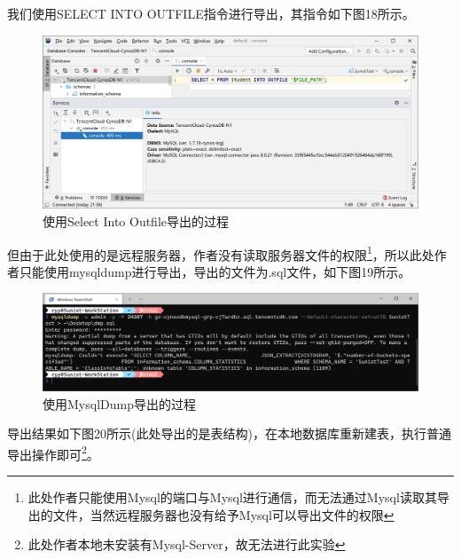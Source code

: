 \documentclass[a4paper,UTF8,heading=false,12pt]{article}
\begin{document}
我们使用SELECT INTO OUTFILE指令进行导出，其指令如下图18所示。

\begin{figure}[htbp]
    \centering
    \includegraphics[width=15cm]{../Images/ExportWithCommand.png}
    \caption{使用Select Into Outfile导出的过程}
\end{figure}

但由于此处使用的是远程服务器，作者没有读取服务器文件的权限\footnote{此处作者只能使用Mysql的端口与Mysql进行通信，而无法通过Mysql读取其导出的文件，当然远程服务器也没有给予Mysql可以导出文件的权限}，所以此处作者只能使用mysqldump进行导出，导出的文件为.sql文件，如下图19所示。

\begin{figure}[htbp]
    \centering
    \includegraphics[width=15cm]{../Images/ExportWithCommand_OnExported.png}
    \caption{使用MysqlDump导出的过程}
\end{figure}

导出结果如下图20所示(此处导出的是表结构)，在本地数据库重新建表，执行普通导出操作即可\footnote{此处作者本地未安装有Mysql-Server，故无法进行此实验}。
\end{document}
